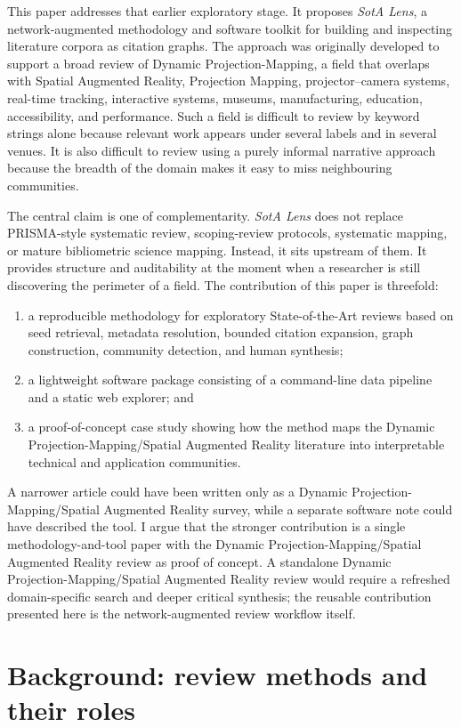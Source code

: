 \documentclass[11pt,a4paper]{article}
\newcommand{\tool}{\emph{SotA Lens}}
\newcommand{\sota}{State-of-the-Art}
\newcommand{\dpm}{Dynamic Projection-Mapping}
\newcommand{\sar}{Spatial Augmented Reality}
\newcommand{\pmapping}{Projection Mapping}
\newcommand{\procam}{projector--camera}
\begin{document}
This paper addresses that earlier exploratory stage. It proposes \tool, a network-augmented methodology and software toolkit for building and inspecting literature corpora as citation graphs. The approach was originally developed to support a broad review of \dpm{}, a field that overlaps with \sar{}, \pmapping{}, \procam{} systems, real-time tracking, interactive systems, museums, manufacturing, education, accessibility, and performance. Such a field is difficult to review by keyword strings alone because relevant work appears under several labels and in several venues. It is also difficult to review using a purely informal narrative approach because the breadth of the domain makes it easy to miss neighbouring communities.

The central claim is one of complementarity. \tool{} does not replace PRISMA-style systematic review, scoping-review protocols, systematic mapping, or mature bibliometric science mapping. Instead, it sits upstream of them. It provides structure and auditability at the moment when a researcher is still discovering the perimeter of a field. The contribution of this paper is threefold:
\begin{enumerate}[leftmargin=*]
    \item a reproducible methodology for exploratory \sota{} reviews based on seed retrieval, metadata resolution, bounded citation expansion, graph construction, community detection, and human synthesis;
    \item a lightweight software package consisting of a command-line data pipeline and a static web explorer; and
    \item a proof-of-concept case study showing how the method maps the \dpm{}/\sar{} literature into interpretable technical and application communities.
\end{enumerate}

A narrower article could have been written only as a \dpm{}/\sar{} survey, while a separate software note could have described the tool. I argue that the stronger contribution is a single methodology-and-tool paper with the \dpm{}/\sar{} review as proof of concept. A standalone \dpm{}/\sar{} review would require a refreshed domain-specific search and deeper critical synthesis; the reusable contribution presented here is the network-augmented review workflow itself.

\section{Background: review methods and their roles}
\end{document}

